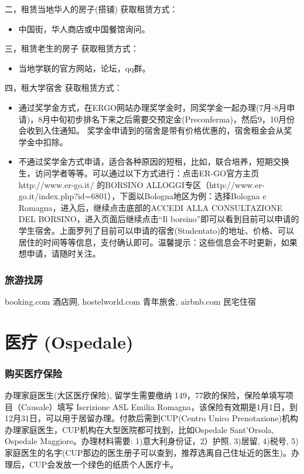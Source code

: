 \documentclass[3pt,a5paper,openright,twoside]{book}
\begin{document}
二，租赁当地华人的房子(搭铺)
获取租赁方式：
\begin{itemize}
\item 中国街，华人商店或中国餐馆询问。
\end{itemize} 

三，租赁老生的房子
获取租赁方式：
\begin{itemize}
\item 当地学联的官方网站，论坛，qq群。
\end{itemize} 

四，租大学宿舍
获取租赁方式：
	\begin{itemize}
		\item 通过奖学金方式，在ERGO网站办理奖学金时，同奖学金一起办理(7月-8月申请)，8月中旬初步排名下来之后需要交预定金(Preconferma)，然后9，10月份会收到入住通知。 奖学金申请到的宿舍是带有价格优惠的，宿舍租金会从奖学金中扣除。
		\item 不通过奖学金方式申请，适合各种原因的短租，比如，联合培养，短期交换生，访问学者等等。可以通过以下方式进行：点击ER-GO官方主页 http://www.er-go.it/ 的BORSINO ALLOGGI专区（http://www.er-go.it/index.php?id=6801），下面以Bologna地区为例：选择Bologna e Romagna，进入后，继续点击底部的ACCEDI ALLA CONSULTAZIONE DEL BORSINO，进入页面后继续点击“Il borsino”即可以看到目前可以申请的学生宿舍。上面罗列了目前可以申请的宿舍(Studentato)的地址、价格、可以居住的时间等等信息，支付确认即可。温馨提示：这些信息会不时更新，如果想申请，请随时关注。
	\end{itemize} 

\subsubsection{旅游找房}
booking.com 酒店网, hostelworld.com 青年旅舍, airbnb.com 民宅住宿



\section{医疗 (Ospedale)}


\subsubsection{购买医疗保险}

办理家庭医生(大区医疗保险), 留学生需要缴纳 149，77欧的保险，保险单填写项目（Causale）填写 Iscrizione ASL Emilia Romagna，该保险有效期是1月1日，到12月31日，可以用于居留办理。付款后需到CUP(Centro Unico Prenotazione)机构办理家庭医生，CUP机构在大型医院都可找到，比如Ospedale Sant'Orsola, Ospedale Maggiore。办理材料需要: 1)意大利身份证，2）护照, 3)居留, 4)税号, 5)家庭医生的名字(CUP那边的医生册子可以查到，推荐选离自己住址近的医生)。办理后，CUP会发放一个绿色的纸质个人医疗卡。
\end{document}
